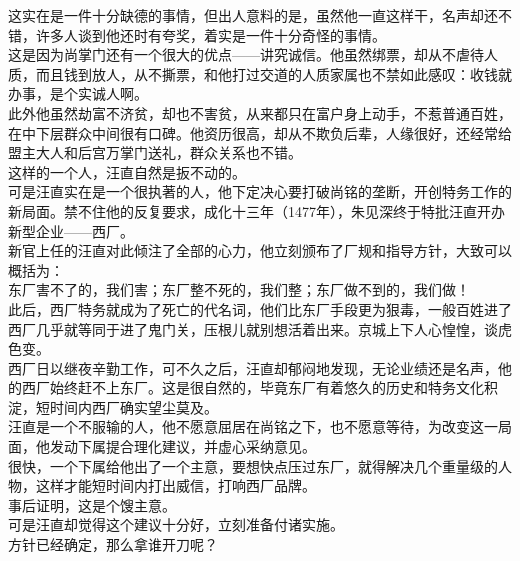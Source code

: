 \begin{multicols}{\theparacolNo}
这实在是一件十分缺德的事情，但出人意料的是，虽然他一直这样干，名声却还不错，许多人谈到他还时有夸奖，着实是一件十分奇怪的事情。\\

这是因为尚掌门还有一个很大的优点——讲究诚信。他虽然绑票，却从不虐待人质，而且钱到放人，从不撕票，和他打过交道的人质家属也不禁如此感叹：收钱就办事，是个实诚人啊。\\

此外他虽然劫富不济贫，却也不害贫，从来都只在富户身上动手，不惹普通百姓，在中下层群众中间很有口碑。他资历很高，却从不欺负后辈，人缘很好，还经常给盟主大人和后宫万掌门送礼，群众关系也不错。\\

这样的一个人，汪直自然是扳不动的。\\

可是汪直实在是一个很执著的人，他下定决心要打破尚铭的垄断，开创特务工作的新局面。禁不住他的反复要求，成化十三年（1477年），朱见深终于特批汪直开办新型企业——西厂。\\

新官上任的汪直对此倾注了全部的心力，他立刻颁布了厂规和指导方针，大致可以概括为：\\

东厂害不了的，我们害；东厂整不死的，我们整；东厂做不到的，我们做！\\

此后，西厂特务就成为了死亡的代名词，他们比东厂手段更为狠毒，一般百姓进了西厂几乎就等同于进了鬼门关，压根儿就别想活着出来。京城上下人心惶惶，谈虎色变。\\

西厂日以继夜辛勤工作，可不久之后，汪直却郁闷地发现，无论业绩还是名声，他的西厂始终赶不上东厂。这是很自然的，毕竟东厂有着悠久的历史和特务文化积淀，短时间内西厂确实望尘莫及。\\

汪直是一个不服输的人，他不愿意屈居在尚铭之下，也不愿意等待，为改变这一局面，他发动下属提合理化建议，并虚心采纳意见。\\

很快，一个下属给他出了一个主意，要想快点压过东厂，就得解决几个重量级的人物，这样才能短时间内打出威信，打响西厂品牌。\\

事后证明，这是个馊主意。\\

可是汪直却觉得这个建议十分好，立刻准备付诸实施。\\

方针已经确定，那么拿谁开刀呢？\\


\end{multicols}
